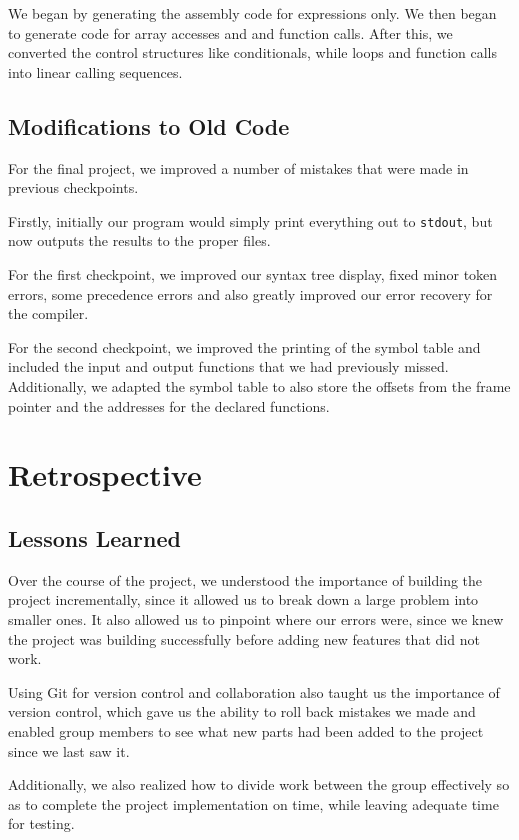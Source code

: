 \documentclass[12pt, letterpaper]{article}
\begin{document}
We began by generating the assembly code for expressions only. We then began to generate code for array accesses and and function calls. After this, we converted the control structures like conditionals, while loops and function calls into linear calling sequences.

\subsection{Modifications to Old Code}
For the final project, we improved a number of mistakes that were made in previous checkpoints.

Firstly, initially our program would simply print everything out to \texttt{stdout}, but now outputs the results to the proper files.

For the first checkpoint, we improved our syntax tree display, fixed minor token errors, some precedence errors and also greatly improved our error recovery for the compiler.

For the second checkpoint, we improved the printing of the symbol table and included the input and output functions that we had previously missed. Additionally, we adapted the symbol table to also store the offsets from the frame pointer and the addresses for the declared functions. 

\section{Retrospective}
\subsection{Lessons Learned}
Over the course of the project, we understood the importance of building the project incrementally, since it allowed us to break down a large problem into smaller ones. It also allowed us to pinpoint where our errors were, since we knew the project was building successfully before adding new features that did not work.

Using Git for version control and collaboration also taught us the importance of version control, which gave us the ability to roll back mistakes we made and enabled group members to see what new parts had been added to the project since we last saw it.

Additionally, we also realized how to divide work between the group effectively so as to complete the project implementation on time, while leaving adequate time for testing.
\end{document}
